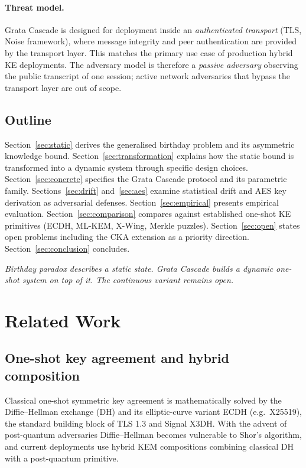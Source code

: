 \documentclass[11pt,a4paper]{article}
\begin{document}
\paragraph{Threat model.} Grata Cascade is designed for deployment inside an \emph{authenticated transport} (TLS, Noise framework), where message integrity and peer authentication are provided by the transport layer. This matches the primary use case of production hybrid KE deployments. The adversary model is therefore a \emph{passive adversary} observing the public transcript of one session; active network adversaries that bypass the transport layer are out of scope.

\subsection{Outline}\label{sec:outline}

Section~\ref{sec:static} derives the generalised birthday problem and its asymmetric knowledge bound. Section~\ref{sec:transformation} explains how the static bound is transformed into a dynamic system through specific design choices. Section~\ref{sec:concrete} specifies the Grata Cascade protocol and its parametric family. Sections~\ref{sec:drift} and~\ref{sec:aes} examine statistical drift and AES key derivation as adversarial defenses. Section~\ref{sec:empirical} presents empirical evaluation. Section~\ref{sec:comparison} compares against established one-shot KE primitives (ECDH, ML-KEM, X-Wing, Merkle puzzles). Section~\ref{sec:open} states open problems including the CKA extension as a priority direction. Section~\ref{sec:conclusion} concludes.

\medskip
\noindent\textit{Birthday paradox describes a static state. Grata Cascade builds a dynamic one-shot system on top of it. The continuous variant remains open.}

\section{Related Work}\label{sec:related}

\subsection{One-shot key agreement and hybrid composition}\label{sec:related-oneshot}

Classical one-shot symmetric key agreement is mathematically solved by the Diffie--Hellman exchange (DH) and its elliptic-curve variant ECDH (e.g.\ X25519), the standard building block of TLS 1.3 and Signal X3DH. With the advent of post-quantum adversaries Diffie--Hellman becomes vulnerable to Shor's algorithm, and current deployments use hybrid KEM compositions combining classical DH with a post-quantum primitive.
\end{document}
